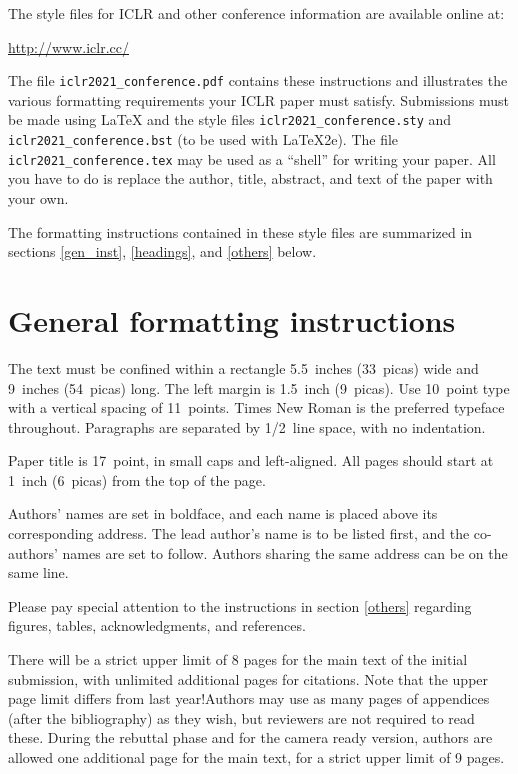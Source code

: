 \documentclass{article}
\begin{document}
The style files for ICLR and other conference information are available online at:
\begin{center}
   \url{http://www.iclr.cc/}
\end{center}
The file \verb+iclr2021_conference.pdf+ contains these
instructions and illustrates the
various formatting requirements your ICLR paper must satisfy.
Submissions must be made using \LaTeX{} and the style files
\verb+iclr2021_conference.sty+ and \verb+iclr2021_conference.bst+ (to be used with \LaTeX{}2e). The file
\verb+iclr2021_conference.tex+ may be used as a ``shell'' for writing your paper. All you
have to do is replace the author, title, abstract, and text of the paper with
your own.

The formatting instructions contained in these style files are summarized in
sections \ref{gen_inst}, \ref{headings}, and \ref{others} below.

\section*{General formatting instructions}
\label{gen_inst}

The text must be confined within a rectangle 5.5~inches (33~picas) wide and
9~inches (54~picas) long. The left margin is 1.5~inch (9~picas).
Use 10~point type with a vertical spacing of 11~points. Times New Roman is the
preferred typeface throughout. Paragraphs are separated by 1/2~line space,
with no indentation.

Paper title is 17~point, in small caps and left-aligned.
All pages should start at 1~inch (6~picas) from the top of the page.

Authors' names are
set in boldface, and each name is placed above its corresponding
address. The lead author's name is to be listed first, and
the co-authors' names are set to follow. Authors sharing the
same address can be on the same line.

Please pay special attention to the instructions in section \ref{others}
regarding figures, tables, acknowledgments, and references.


There will be a strict upper limit of 8 pages for the main text of the initial submission, with unlimited additional pages for citations. Note that the upper page limit differs from last year!Authors may use as many pages of appendices (after the bibliography) as they wish, but reviewers are not required to read these. During the rebuttal phase and for the camera ready version, authors are allowed one additional page for the main text, for a strict upper limit of 9 pages.
\end{document}
